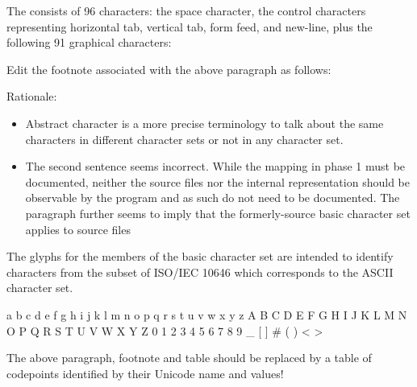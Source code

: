 \documentclass{wg21}
\begin{document}
\pnum
{}%
The  consists of 96 characters: the space character,
the control characters representing horizontal tab, vertical tab, form feed, and
new-line, plus the following 91 graphical characters:

\begin{quoteblock}
Edit the footnote associated with the above paragraph as follows:

Rationale:
\begin{itemize}
\item Abstract character is a more precise terminology to talk about the same characters in different character sets or not in any character set.
\item The second sentence seems incorrect. While the mapping in phase 1 must be documented, neither the source files nor the internal representation should be observable by the program and as such do not need to be documented. The paragraph further seems to imply that the formerly-source basic character set applies to source files
\end{itemize}

\begin{quoteblock}
The glyphs for
the members of the basic  character set are intended to
identify  characters from the subset of ISO/IEC 10646 which corresponds to the ASCII
character set. 
\end{quoteblock}
\end{quoteblock}

\begin{codeblock}
    a b c d e f g h i j k l m n o p q r s t u v w x y z
    A B C D E F G H I J K L M N O P Q R S T U V W X Y Z
    0 1 2 3 4 5 6 7 8 9
    _ { } [ ] # ( ) < > %
\end{codeblock}

\begin{quoteblock}
The above paragraph, footnote and table should be replaced by a table of codepoints identified by their Unicode name and values!
\end{quoteblock}
\end{document}
